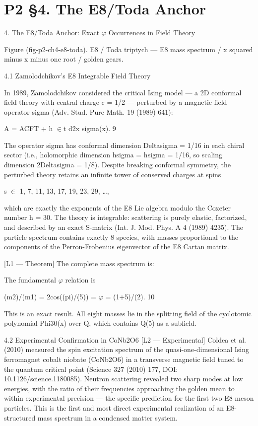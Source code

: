
\section{P2 §4. The E8/Toda Anchor}

4. The E8/Toda Anchor: Exact $\varphi$ Occurrences in Field
  Theory

     Figure (fig-p2-ch4-e8-toda). E8 / Toda triptych --- E8 mass spectrum / x squared minus x minus
                                         one root / golden gears.

  4.1 Zamolodchikov's E8 Integrable Field Theory

  In 1989, Zamolodchikov considered the critical Ising model --- a 2D conformal field
  theory with central charge c = 1/2 --- perturbed by a magnetic field operator sigma
  (Adv. Stud. Pure Math. 19 (1989) 641):

  A = ACFT + h $\in$t d2x sigma(x). 9

  The operator sigma has conformal dimension Deltasigma = 1/16 in each chiral sector
  (i.e., holomorphic dimension hsigma = hsigma = 1/16, so scaling dimension
  2Deltasigma = 1/8). Despite breaking conformal symmetry, the perturbed theory
  retains an infinite tower of conserved charges at spins

  s $\in$ {1, 7, 11, 13, 17, 19, 23, 29, …},

  which are exactly the exponents of the E8 Lie algebra modulo the Coxeter number h =
  30. The theory is integrable: scattering is purely elastic, factorized, and described by an
  exact S-matrix (Int. J. Mod. Phys. A 4 (1989) 4235). The particle spectrum contains
  exactly 8 species, with masses proportional to the components of the Perron-Frobenius
  eigenvector of the E8 Cartan matrix.

  [L1 --- Theorem] The complete mass spectrum is:

  The fundamental $\varphi$ relation is

  (m2)/(m1) = 2cos((pi)/(5)) = $\varphi$ = (1+5)/(2). 10

  This is an exact result. All eight masses lie in the splitting field of the cyclotomic
  polynomial Phi30(x) over Q, which contains Q(5) as a subfield.

  4.2 Experimental Confirmation in CoNb2O6
  [L2 --- Experimental] Coldea et al. (2010) measured the spin excitation spectrum of the
  quasi-one-dimensional Ising ferromagnet cobalt niobate (CoNb2O6) in a transverse
  magnetic field tuned to the quantum critical point (Science 327 (2010) 177, DOI:
  10.1126/science.1180085). Neutron scattering revealed two sharp modes at low
  energies, with the ratio of their frequencies approaching the golden mean to within
  experimental precision --- the specific prediction for the first two E8 meson particles.
  This is the first and most direct experimental realization of an E8-structured mass
  spectrum in a condensed matter system.


